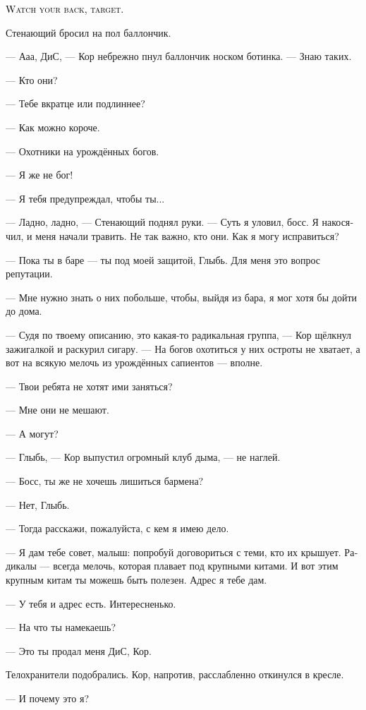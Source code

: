 \documentclass[a4paper,12pt,fleqn]{book}\usepackage{cooltooltips}\usepackage{polyglossia}\setdefaultlanguage[babelshorthands=true]{russian}\setotherlanguage{english}\defaultfontfeatures{Ligatures=TeX,Mapping=tex-text} \usepackage{xcolor}\definecolor{lightgray}{HTML}{bbbbbb}\color{lightgray}\newcommand{\ml}[3]{\textenglish{\textcolor{black}{#3}}}
\newcommand{\asterism}{\vspace{1em}{\centering\Large\bfseries$\ast~\ast~\ast$\par}\vspace{1em}}
\begin{document}
\ml{$0$}
{<<Оглядывайся, цель>>.}
{\textsc{Watch your back, target.}}


\asterism

Стенающий бросил на пол баллончик.

--- Ааа, ДиС, --- Кор небрежно пнул баллончик носком ботинка.
--- Знаю таких.

--- Кто они?

--- Тебе вкратце или подлиннее?

--- Как можно короче.

--- Охотники на урождённых богов.

--- Я же не бог!

--- Я тебя предупреждал, чтобы ты...

--- Ладно, ладно, --- Стенающий поднял руки.
--- Суть я уловил, босс.
Я накосячил, и меня начали травить.
Не так важно, кто они.
Как я могу исправиться?

--- Пока ты в баре --- ты под моей защитой, Глыбь.
Для меня это вопрос репутации.

--- Мне нужно знать о них побольше, чтобы, выйдя из бара, я мог хотя бы дойти до дома.

--- Судя по твоему описанию, это какая-то радикальная группа, --- Кор щёлкнул зажигалкой и раскурил сигару.
--- На богов охотиться у них остроты не хватает, а вот на всякую мелочь из урождённых сапиентов --- вполне.

--- Твои ребята не хотят ими заняться?

--- Мне они не мешают.

--- А могут?

--- Глыбь, --- Кор выпустил огромный клуб дыма, --- не наглей.

--- Босс, ты же не хочешь лишиться бармена?

--- Нет, Глыбь.

--- Тогда расскажи, пожалуйста, с кем я имею дело.

--- Я дам тебе совет, малыш: попробуй договориться с теми, кто их крышует.
Радикалы --- всегда мелочь, которая плавает под крупными китами.
И вот этим крупным китам ты можешь быть полезен.
Адрес я тебе дам.

--- У тебя и адрес есть.
Интересненько.

--- На что ты намекаешь?

--- Это ты продал меня ДиС, Кор.

Телохранители подобрались.
Кор, напротив, расслабленно откинулся в кресле.

--- И почему это я?
\end{document}
